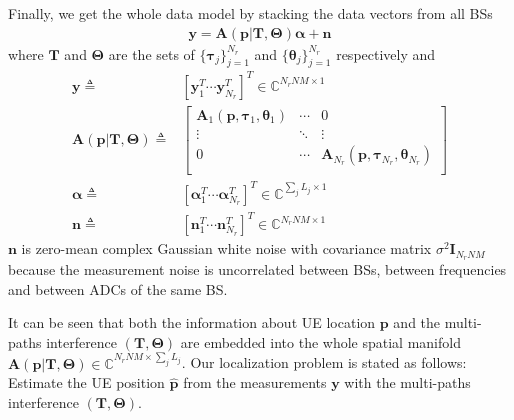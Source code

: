 \documentclass[journal]{IEEEtran}
\begin{document}
Finally, we get the whole data model by stacking the data vectors from all BSs
\begin{align}\label{CFR_NrNM0}
  \boldsymbol{y}=\boldsymbol{A}(\boldsymbol{p}\vert \mathbf{T},\boldsymbol{\Theta})\boldsymbol{\alpha}+\boldsymbol{n}
\end{align} 
where $\mathbf{T}$ and $\boldsymbol{\Theta}$ are the sets of $\{\boldsymbol{\tau}_j\}_{j=1}^{N_r}$ and $\{\boldsymbol{\theta}_j\}_{j=1}^{N_r}$ respectively and 
\begin{align}\label{CFR_NrNM1}
  \boldsymbol{y}\triangleq& [\boldsymbol{y}_1^T\cdots \boldsymbol{y}_{N_r}^T]^T \in \mathbb{C}^{N_rNM \times 1}\\ \nonumber
  \boldsymbol{A}(\boldsymbol{p}\vert \mathbf{T},\boldsymbol{\Theta})\triangleq&\left[
  \begin{array}{ccc}
    \boldsymbol{A}_1(\boldsymbol{p},\boldsymbol{\tau}_1,\boldsymbol{\theta}_1)&\cdots&0\\
    \vdots &\ddots &\vdots\\
    0&\cdots&\boldsymbol{A}_{N_r}(\boldsymbol{p},\boldsymbol{\tau}_{N_r},\boldsymbol{\theta}_{N_r})\\
  \end{array}\right]\\ \nonumber
  \boldsymbol{\alpha}\triangleq& [\boldsymbol{\alpha}^T_1 \cdots \boldsymbol{\alpha}^T_{N_r}]^T\in \mathbb{C}^{\sum_jL_j\times 1}\\ \nonumber
  \boldsymbol{n}\triangleq& [\boldsymbol{n}_1^T\cdots \boldsymbol{n}_{N_r}^T]^T\in \mathbb{C}^{N_rNM \times 1}
\end{align}
$\boldsymbol{n}$ is zero-mean complex Gaussian white noise with covariance matrix $\sigma^2\boldsymbol{I}_{N_rNM}$ because the measurement noise is uncorrelated between BSs, between frequencies and between ADCs of the same BS.

It can be seen that both the information about UE location $\boldsymbol{p}$ and the multi-paths interference $(\mathbf{T},\boldsymbol{\Theta})$ are embedded into the whole spatial manifold $\boldsymbol{A}(\boldsymbol{p}\vert \mathbf{T},\boldsymbol{\Theta})\in \mathbb{C}^{N_rNM\times\sum_jL_j}$. Our localization problem is stated as follows: Estimate the UE position $\hat{\boldsymbol{p}}$ from the measurements $\boldsymbol{y}$ with the multi-paths interference $(\mathbf{T},\boldsymbol{\Theta})$.
\end{document}
